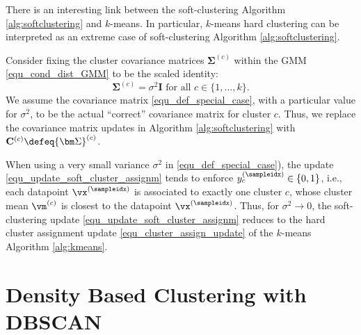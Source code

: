 \documentclass[12pt]{report}
\begin{document}
There is an interesting link between the soft-clustering 
Algorithm \ref{alg:softclustering} and $k$-means. In 
particular, $k$-means hard clustering can be interpreted 
as an extreme case of soft-clustering Algorithm \ref{alg:softclustering}. 

Consider fixing the cluster covariance matrices $ {\bm \Sigma}^{(c)}$ 
within the GMM \eqref{equ_cond_dist_GMM} to be the scaled identity: 
\begin{equation}
\label{equ_def_special_case}
 {\bm \Sigma}^{(c)}= \sigma^{2} \mathbf{I} \mbox{ for all } c \in \{1,\ldots,k\}.  
\end{equation} 
We assume the covariance matrix \eqref{equ_def_special_case}, 
with a particular value for $\sigma^{2}$, to be the actual ``correct'' 
covariance matrix for cluster $c$. %
Thus, we replace the covariance matrix updates in Algorithm \ref{alg:softclustering} 
with $\mathbf{C}^{(c)} \defeq  {\bm \Sigma}^{(c)}$.
 
When using a very small variance $\sigma^{2}$ in \eqref{equ_def_special_case}), 
the update \eqref{equ_update_soft_cluster_assignm} tends to enforce 
$y_{c}^{(\sampleidx)} \in \{0,1\}$, i.e., each datapoint $\vx^{(\sampleidx)}$ 
is associated to exactly one cluster $c$, whose cluster mean $\vm^{(c)}$ 
is closest to the datapoint $\vx^{(\sampleidx)}$. Thus, for $\sigma^{2} \rightarrow 0$, 
the soft-clustering update \eqref{equ_update_soft_cluster_assignm} reduces 
to the hard cluster assignment update \eqref{equ_cluster_assign_update} 
of the $k$-means Algorithm \ref{alg:kmeans}. 

\section{Density Based Clustering with DBSCAN}
\end{document}
